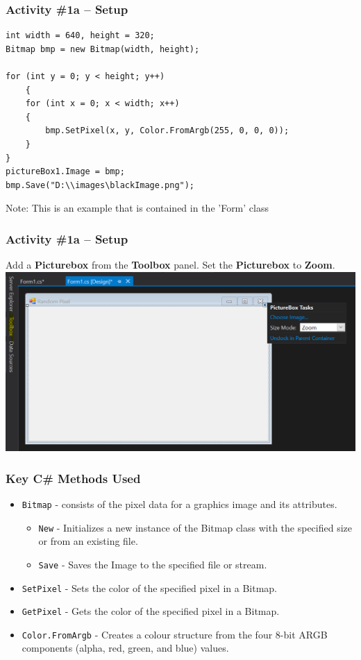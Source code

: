 \begin{frame}[fragile]
	\frametitle{Activity \#1a -- Setup}
	
\begin{lstlisting}
int width = 640, height = 320;
Bitmap bmp = new Bitmap(width, height);

for (int y = 0; y < height; y++)
	{
	for (int x = 0; x < width; x++)
	{
		bmp.SetPixel(x, y, Color.FromArgb(255, 0, 0, 0));
	}
}
pictureBox1.Image = bmp;
bmp.Save("D:\\images\blackImage.png");
\end{lstlisting}
Note: This is an example that is contained in the 'Form' class
\end{frame}
\begin{frame}[fragile]
	\frametitle{Activity \#1a -- Setup}
	
Add a \textbf{Picturebox} from the \textbf{Toolbox} panel. Set the \textbf{Picturebox} to \textbf{Zoom}.
\center\includegraphics[scale=0.51]{initial-form-layout}
\end{frame}

\begin{frame}
		\frametitle{Key C\# Methods Used}
			\begin{itemize}		
			\item \texttt{Bitmap} - consists of the pixel data for a graphics image and its attributes.
				\begin{itemize}	
					\item \texttt{New} - Initializes a new instance of the Bitmap class with the specified size or from an existing file.
					\item \texttt{Save} - Saves the Image to the specified file or stream.
				\end{itemize}	
			\item \texttt{SetPixel} - Sets the color of the specified pixel in a Bitmap.
			\item \texttt{GetPixel} - Gets the color of the specified pixel in a Bitmap.
			\item \texttt{Color.FromArgb} - Creates a colour structure from the four 8-bit ARGB components (alpha, red, green, and blue) values.	
			\end{itemize}
\end{frame}	

